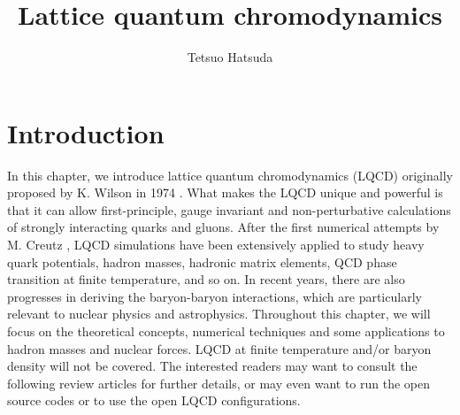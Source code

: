 \title{Lattice quantum chromodynamics}\label{chap:latticeqcd}
\author{Tetsuo Hatsuda} 
\maketitle
{}


\section{Introduction}

In this chapter, we introduce  lattice quantum chromodynamics (LQCD) 
originally proposed by K. Wilson in 1974 \cite{Wilson:1974sk}. What makes the LQCD unique and powerful is that
it can allow first-principle,  gauge invariant and non-perturbative calculations of strongly interacting
quarks and gluons.  After the first numerical attempts by M. Creutz \cite{Creutz:1980zw},
 LQCD simulations have been extensively applied to study heavy quark potentials,
hadron masses,  hadronic matrix elements, QCD phase transition at finite temperature, 
and so on.  In recent years, there are also progresses 
in deriving the  baryon-baryon interactions, which are particularly relevant to 
nuclear physics and astrophysics. Throughout this chapter, we will focus on the theoretical concepts, numerical techniques and some
applications to hadron masses and nuclear forces.  LQCD at finite temperature and/or baryon density will
not be covered.  The interested readers may want to consult the  following review articles for further details, or may even 
want to run the open source codes or to use the open LQCD configurations.

\vspace{0.3cm}

